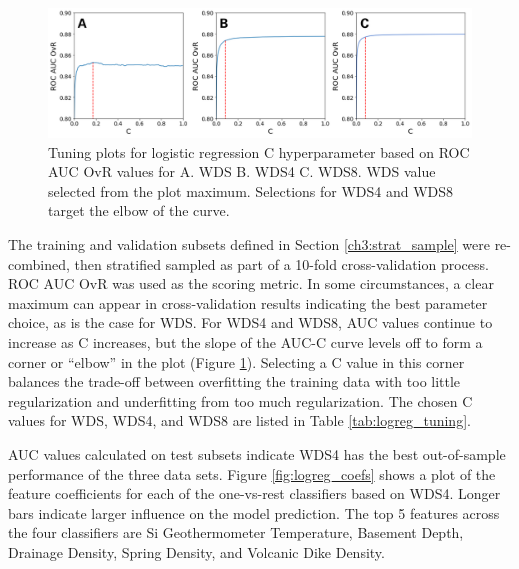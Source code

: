 \begin{figure}[!htp]
\centering
\includegraphics[width=\textwidth]{templates/images/Figure-LR_C_tuning.png}
\singlespacing
\caption[Logistic regression hyperparameter tuning]{Tuning plots for logistic regression C hyperparameter based on ROC AUC OvR values for A. WDS  B. WDS4 C. WDS8. WDS value selected from the plot maximum. Selections for WDS4 and WDS8 target the elbow of the curve.}
\label{fig:logreg_hp_tuning}
\end{figure}

The training and validation subsets defined in Section \ref{ch3:strat_sample} were re-combined, then stratified sampled as part of a 10-fold cross-validation process. ROC AUC OvR was used as the scoring metric. In some circumstances, a clear maximum can appear in cross-validation results indicating the best parameter choice, as is the case for WDS. For WDS4 and WDS8, AUC values continue to increase as C increases, but the slope of the AUC-C curve levels off to form a corner or “elbow” in the plot (Figure \ref{fig:logreg_hp_tuning}). Selecting a C value in this corner balances the trade-off between overfitting the training data with too little regularization and underfitting from too much regularization. The chosen C values for WDS, WDS4, and WDS8 are listed in Table \ref{tab:logreg_tuning}.

AUC values calculated on test subsets indicate WDS4 has the best out-of-sample performance of the three data sets. Figure \ref{fig:logreg_coefs} shows a plot of the feature coefficients for each of the one-vs-rest classifiers based on WDS4. Longer bars indicate larger influence on the model prediction. The top 5 features across the four classifiers are Si Geothermometer Temperature, Basement Depth, Drainage Density, Spring Density, and Volcanic Dike Density.

